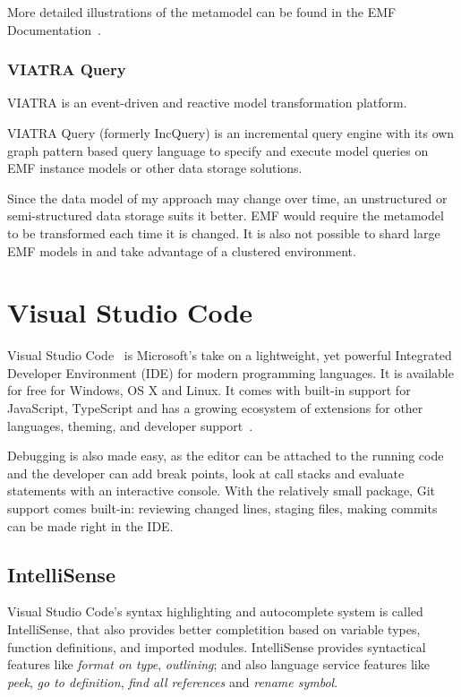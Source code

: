 More detailed illustrations of the metamodel can be found in the EMF Documentation~\cite{ecore}.


\subsubsection{VIATRA Query}
VIATRA is an event-driven and reactive model transformation platform. 

VIATRA Query (formerly IncQuery) is an incremental query engine with its own graph pattern based query language to specify and execute model queries on EMF instance models or other data storage solutions.

Since the data model of my approach may change over time, an unstructured or semi-structured data storage suits it better. EMF would require the metamodel to be transformed each time it is changed. It is also not possible to shard large EMF models in and take advantage of a clustered environment.


\section{Visual Studio Code}
Visual Studio Code~\cite{vscode} is Microsoft's take on a lightweight, yet powerful Integrated Developer Environment (IDE) for modern programming languages. It is available for free for Windows, OS X and Linux. It comes with built-in support for JavaScript, TypeScript and has a growing ecosystem of extensions for other languages, theming, and developer support~\cite{vscode-extensions}.

Debugging is also made easy, as the editor can be attached to the running code and the developer can add break points, look at call stacks and evaluate statements with an interactive console. With the relatively small package, Git support comes built-in: reviewing changed lines, staging files, making commits can be made right in the IDE.

\subsection{IntelliSense}
Visual Studio Code's syntax highlighting and autocomplete system is called IntelliSense, that also provides better completition based on variable types, function definitions, and imported modules. IntelliSense provides syntactical features like \emph{format on type}, \emph{outlining}; and also language service features like \emph{peek}, \emph{go to definition}, \emph{find all references} and \emph{rename symbol}.

